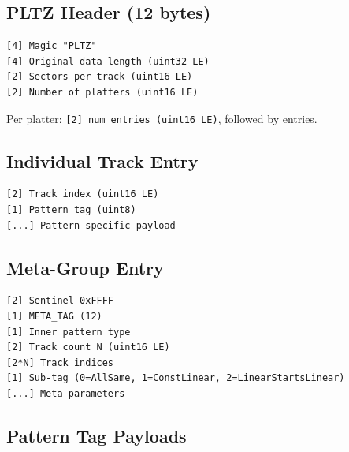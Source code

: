 \documentclass[11pt,a4paper]{article}
\begin{document}
\subsection{PLTZ Header (12 bytes)}

\begin{lstlisting}
[4] Magic "PLTZ"
[4] Original data length (uint32 LE)
[2] Sectors per track (uint16 LE)
[2] Number of platters (uint16 LE)
\end{lstlisting}

Per platter: \texttt{[2] num\_entries (uint16 LE)}, followed by entries.

\subsection{Individual Track Entry}

\begin{lstlisting}
[2] Track index (uint16 LE)
[1] Pattern tag (uint8)
[...] Pattern-specific payload
\end{lstlisting}

\subsection{Meta-Group Entry}

\begin{lstlisting}
[2] Sentinel 0xFFFF
[1] META_TAG (12)
[1] Inner pattern type
[2] Track count N (uint16 LE)
[2*N] Track indices
[1] Sub-tag (0=AllSame, 1=ConstLinear, 2=LinearStartsLinear)
[...] Meta parameters
\end{lstlisting}

\subsection{Pattern Tag Payloads}
\end{document}
